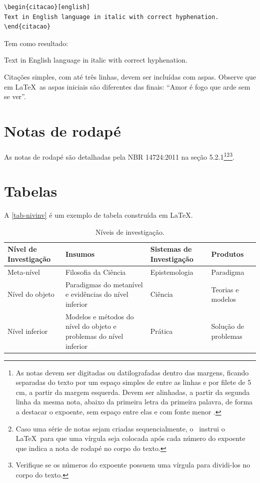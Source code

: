 \begin{verbatim}
\begin{citacao}[english]
Text in English language in italic with correct hyphenation.
\end{citacao}
\end{verbatim}

Tem como resultado:

\begin{citacao}[english]
Text in English language in italic with correct hyphenation.
\end{citacao}

Citações simples, com até três linhas, devem ser incluídas com aspas. Observe que em \LaTeX\ as aspas iniciais são diferentes das finais: ``Amor é fogo que arde sem se ver''.

\section{Notas de rodapé}

As notas de rodapé são detalhadas pela NBR 14724:2011 na seção 5.2.1\footnote{As notas devem ser digitadas ou datilografadas dentro das margens, ficando separadas do texto por um espaço simples de entre as linhas e por filete de 5 cm, a partir da margem esquerda. Devem ser alinhadas, a partir da segunda linha da mesma nota, abaixo da primeira letra da primeira palavra, de forma a destacar o expoente, sem espaço entre elas e com fonte menor \textcite[seção 5.2.1]{NBR14724:2011}.}\footnote{Caso uma série de notas sejam criadas sequencialmente, o \abnTeX\ instrui o \LaTeX\ para que uma vírgula seja colocada após cada número do expoente que indica a nota de rodapé no corpo do texto.}\footnote{Verifique se os números do expoente possuem uma vírgula para dividi-los no corpo do texto.}.

\section{Tabelas}

A \autoref{tab-nivinv} é um exemplo de tabela construída em
\LaTeX.

\begin{table}[htb]
\footnotesize
\caption[Níveis de investigação]{Níveis de investigação.}
\label{tab-nivinv}
\begin{tabular}{p{2.6cm}|p{6.0cm}|p{2.25cm}|p{3.40cm}}
   \textbf{Nível de Investigação} & \textbf{Insumos}  & \textbf{Sistemas de Investigação}  & \textbf{Produtos}  \\
    \hline
    Meta-nível & Filosofia da Ciência  & Epistemologia &
    Paradigma  \\
    \hline
    Nível do objeto & Paradigmas do metanível e evidências do nível inferior &
    Ciência  & Teorias e modelos \\
    \hline
    Nível inferior & Modelos e métodos do nível do objeto e problemas do nível inferior & Prática & Solução de problemas  \\
\end{tabular}
\end{table}

